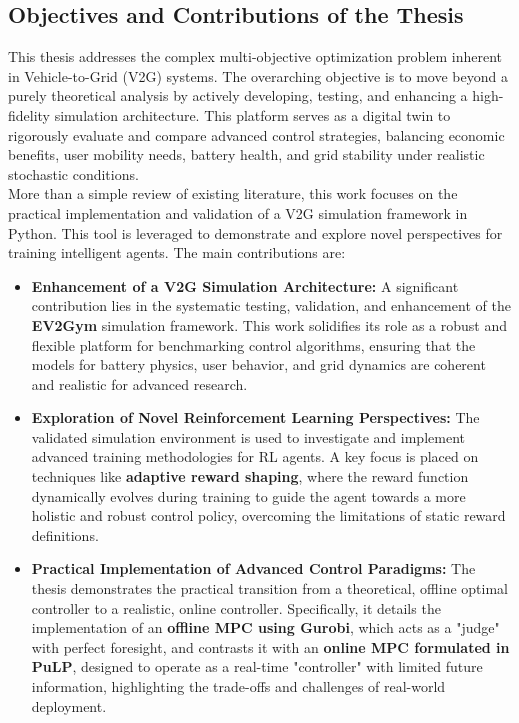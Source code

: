 \subsection{Objectives and Contributions of the Thesis}

This thesis addresses the complex multi-objective optimization problem inherent in Vehicle-to-Grid (V2G) systems. The overarching objective is to move beyond a purely theoretical analysis by actively developing, testing, and enhancing a high-fidelity simulation architecture. This platform serves as a digital twin to rigorously evaluate and compare advanced control strategies, balancing economic benefits, user mobility needs, battery health, and grid stability under realistic stochastic conditions.
\\
More than a simple review of existing literature, this work focuses on the practical implementation and validation of a V2G simulation framework in Python. This tool is leveraged to demonstrate and explore novel perspectives for training intelligent agents. The main contributions are:

\begin{itemize}
    \item \textbf{Enhancement of a V2G Simulation Architecture:} A significant contribution lies in the systematic testing, validation, and enhancement of the \textbf{EV2Gym} simulation framework. This work solidifies its role as a robust and flexible platform for benchmarking control algorithms, ensuring that the models for battery physics, user behavior, and grid dynamics are coherent and realistic for advanced research.

    \item \textbf{Exploration of Novel Reinforcement Learning Perspectives:} The validated simulation environment is used to investigate and implement advanced training methodologies for RL agents. A key focus is placed on techniques like \textbf{adaptive reward shaping}, where the reward function dynamically evolves during training to guide the agent towards a more holistic and robust control policy, overcoming the limitations of static reward definitions.

    \item \textbf{Practical Implementation of Advanced Control Paradigms:} The thesis demonstrates the practical transition from a theoretical, offline optimal controller to a realistic, online controller. Specifically, it details the implementation of an \textbf{offline MPC using Gurobi}, which acts as a "judge" with perfect foresight, and contrasts it with an \textbf{online MPC formulated in PuLP}, designed to operate as a real-time "controller" with limited future information, highlighting the trade-offs and challenges of real-world deployment.
\end{itemize}



